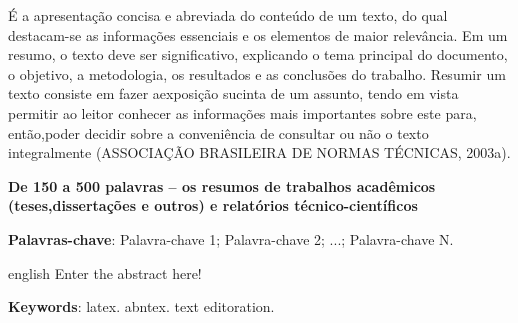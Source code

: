 \begin{resumo}
  É a apresentação concisa e abreviada do conteúdo de um texto, do qual destacam-se as informações essenciais e os elementos de maior relevância. Em um resumo, o texto deve ser significativo, explicando o tema principal do documento, o objetivo, a metodologia, os resultados e as conclusões do trabalho. Resumir um texto consiste em fazer aexposição sucinta de um assunto, tendo em vista permitir ao leitor conhecer as informações mais importantes sobre este para, então,poder decidir sobre a conveniência de consultar ou não o texto integralmente (ASSOCIAÇÃO BRASILEIRA DE NORMAS TÉCNICAS, 2003a).

  \textbf{De 150 a 500 palavras – os resumos de trabalhos acadêmicos (teses,dissertações e outros) e relatórios técnico-científicos}

  \textbf{Palavras-chave}: Palavra-chave 1; Palavra-chave 2; ...; Palavra-chave N.
\end{resumo}

\begin{resumo}[Abstract]
\begin{otherlanguage*}{english}
  Enter the abstract here!
  
  \textbf{Keywords}: latex. abntex. text editoration.
\end{otherlanguage*}
\end{resumo}